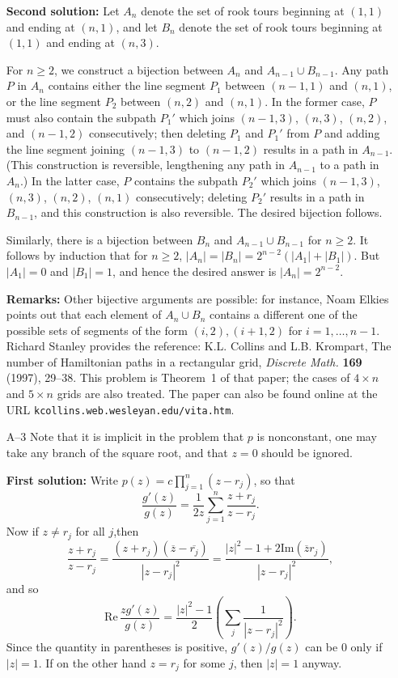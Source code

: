 \documentclass[amssymb,twocolumn,pra,10pt,aps]{revtex4-1}
\begin{document}
\begin{itemize}
\textbf{Second solution:}
Let $A_n$ denote the set of rook tours beginning at $(1,1)$ and
ending at $(n,1)$, and let $B_n$ denote the set of rook tours
beginning at $(1,1)$ and ending at $(n,3)$.

For $n \geq 2$, we construct a bijection between $A_n$ and $A_{n-1}
\cup B_{n-1}$. Any path $P$ in $A_n$ contains either the line segment
$P_1$ between $(n-1,1)$ and $(n,1)$, or the line segment $P_2$ between
$(n,2)$ and $(n,1)$. In the former case, $P$ must also contain the
subpath $P_1'$ which joins $(n-1,3)$, $(n,3)$, $(n,2)$, and $(n-1,2)$
consecutively; then deleting $P_1$ and $P_1'$ from $P$ and adding the
line segment joining $(n-1,3)$ to $(n-1,2)$ results in a path in
$A_{n-1}$. (This construction is reversible, lengthening any path in
$A_{n-1}$ to a path in $A_n$.) In the latter case, $P$ contains the
subpath $P_2'$ which joins $(n-1,3)$, $(n,3)$, $(n,2)$, $(n,1)$
consecutively; deleting $P_2'$ results in a path in $B_{n-1}$, and
this construction is also reversible. The desired bijection follows.

Similarly, there is a bijection between $B_n$ and $A_{n-1} \cup
B_{n-1}$ for $n \geq 2$. It follows by induction that for $n \geq 2$,
$|A_n| = |B_n| = 2^{n-2} (|A_1| + |B_1|)$. But $|A_1| = 0$ and $|B_1|
= 1$, and hence the desired answer is $|A_n| = 2^{n-2}$.

\textbf{Remarks:}
Other bijective arguments are possible: for instance, Noam Elkies
points out that each element of $A_n \cup B_n$
contains a different one of the possible sets of
segments of the form $(i,2),(i+1,2)$ for $i=1,\dots,n-1$.
Richard Stanley provides the reference: K.L. Collins and L.B. Krompart,
The number of Hamiltonian paths in a rectangular grid,
\textit{Discrete Math.}  \textbf{169} (1997), 29--38. This problem
is Theorem~1 of that paper; the cases of $4 \times n$ and $5 \times n$
grids
are also treated. The paper can also be found online at the URL
\texttt{kcollins.web.wesleyan.edu/vita.htm}.

\item[A--3]
Note that it is implicit in the problem that $p$ is nonconstant,
one may take any branch of the square root, and that $z=0$ should be
ignored.

\textbf{First solution:}
Write $p(z) = c \prod_{j=1}^n (z-r_j)$, so that
\[
\frac{g'(z)}{g(z)} = \frac{1}{2z} \sum_{j=1}^n \frac{z+r_j}{z-r_j}.
\]
Now if $z\neq r_j$ for all $j$,then
\[
\frac{z+r_j}{z-r_j}
= \frac{(z+r_j)(\overline{z}-\overline{r_j})}{|z-r_j|^2}
= \frac{|z|^2-1+2 \mathrm{Im}(\overline{z} r_j)}{|z-r_j|^2},
\]
and so
\[
\mathrm{Re}\, \frac{z g'(z)}{g(z)} = \frac{|z|^2-1}{2} \left(
\sum_j \frac{1}{|z-r_j|^2} \right).
\]
Since the quantity in parentheses
is positive, $g'(z)/g(z)$ can be $0$ only if $|z|=1$. If on the other
hand $z = r_j$ for some $j$, then $|z|=1$ anyway.


\end{itemize}
\end{document}
